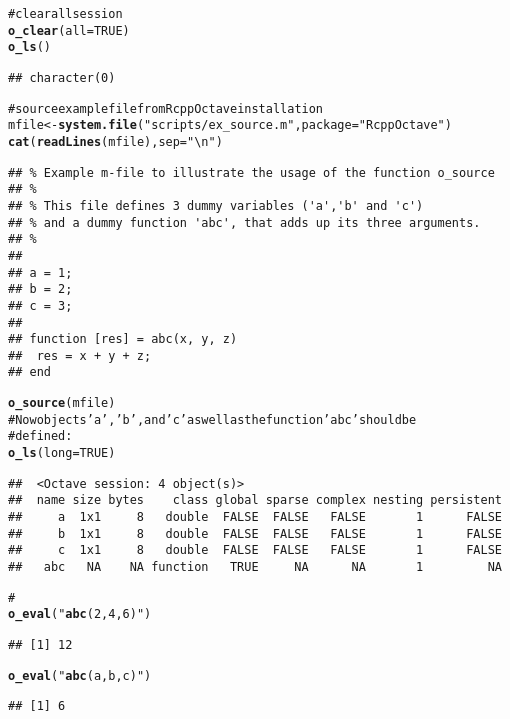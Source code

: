 \documentclass[english,10pt,a4paper]{article}\usepackage{graphicx, color}
\makeatletter
\newcommand{\hlfunctioncall}[1]{\textcolor[rgb]{0.501960784313725,0,0.329411764705882}{\textbf{#1}}}%
\newcommand{\hlstring}[1]{\textcolor[rgb]{0.6,0.6,1}{#1}}%
\newcommand{\hlcomment}[1]{\textcolor[rgb]{0.180392156862745,0.6,0.341176470588235}{#1}}%
\newenvironment{kframe}{%
 \def\at@end@of@kframe{}%
 \ifinner\ifhmode%
  \def\at@end@of@kframe{\end{minipage}}%
  \begin{minipage}{\columnwidth}%
 \fi\fi%
 \def\FrameCommand##1{\hskip\@totalleftmargin \hskip-\fboxsep
 \colorbox{shadecolor}{##1}\hskip-\fboxsep
     \hskip-\linewidth \hskip-\@totalleftmargin \hskip\columnwidth}%
 \MakeFramed {\advance\hsize-\width
   \@totalleftmargin\z@ \linewidth\hsize
   \@setminipage}}%
 {\par\unskip\endMakeFramed%
 \at@end@of@kframe}
\newenvironment{knitrout}{}{} %
\makeatother
\begin{document}
\begin{knitrout}
\color{fgcolor}\begin{kframe}
\begin{alltt}
\hlcomment{# clear all session}
\hlfunctioncall{o_clear}(all = TRUE)
\hlfunctioncall{o_ls}()
\end{alltt}
\begin{verbatim}
## character(0)
\end{verbatim}
\begin{alltt}

\hlcomment{# source example file from RcppOctave installation}
mfile <- \hlfunctioncall{system.file}(\hlstring{"scripts/ex_source.m"}, package = \hlstring{"RcppOctave"})
\hlfunctioncall{cat}(\hlfunctioncall{readLines}(mfile), sep = \hlstring{"\textbackslash{}n"})
\end{alltt}
\begin{verbatim}
## % Example m-file to illustrate the usage of the function o_source
## %
## % This file defines 3 dummy variables ('a','b' and 'c') 
## % and a dummy function 'abc', that adds up its three arguments.
## % 
## 
## a = 1;
## b = 2;
## c = 3;
## 
## function [res] = abc(x, y, z)
## 	res = x + y + z; 
## end
\end{verbatim}
\begin{alltt}
\hlfunctioncall{o_source}(mfile)
\hlcomment{# Now objects 'a', 'b', and 'c' as well as the function 'abc' should be}
\hlcomment{# defined:}
\hlfunctioncall{o_ls}(long = TRUE)
\end{alltt}
\begin{verbatim}
##  <Octave session: 4 object(s)>
##  name size bytes    class global sparse complex nesting persistent
##     a  1x1     8   double  FALSE  FALSE   FALSE       1      FALSE
##     b  1x1     8   double  FALSE  FALSE   FALSE       1      FALSE
##     c  1x1     8   double  FALSE  FALSE   FALSE       1      FALSE
##   abc   NA    NA function   TRUE     NA      NA       1         NA
\end{verbatim}
\begin{alltt}
\hlcomment{#}
\hlfunctioncall{o_eval}(\hlstring{"\hlfunctioncall{abc}(2, 4, 6)"})
\end{alltt}
\begin{verbatim}
## [1] 12
\end{verbatim}
\begin{alltt}
\hlfunctioncall{o_eval}(\hlstring{"\hlfunctioncall{abc}(a, b, c)"})
\end{alltt}
\begin{verbatim}
## [1] 6
\end{verbatim}
\end{kframe}
\end{knitrout}
\end{document}
